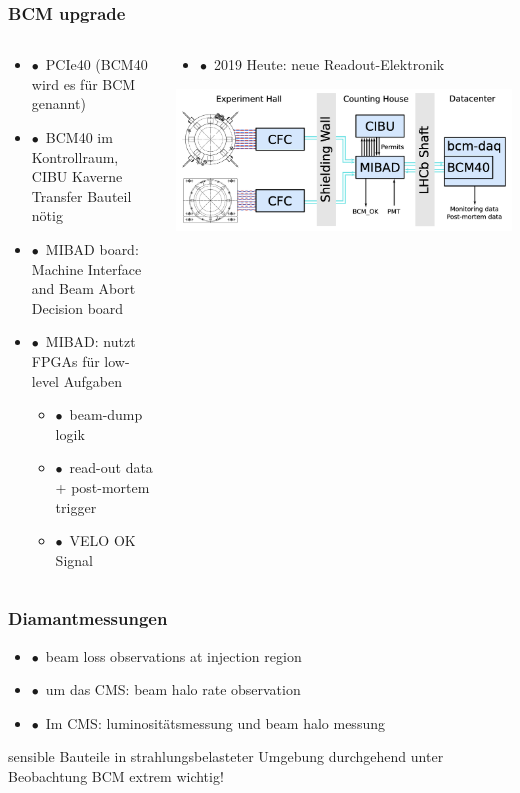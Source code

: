 \documentclass[aspectratio=1610, 12pt, xcolor=dvipsnames]{beamer}
\begin{document}
\begin{frame}\frametitle{BCM upgrade}
  \begin{columns}
    \begin{column}[c]{0.48\textwidth}
      \begin{itemize}
        \item $\bullet$\, \to PCIe40 (BCM40 wird es für BCM genannt)
        \item $\bullet$\, BCM40 im Kontrollraum, CIBU Kaverne \to Transfer Bauteil nötig
        \item $\bullet$\, \to MIBAD board: Machine Interface and Beam Abort Decision board
        \item $\bullet$\, MIBAD: nutzt FPGAs für low-level Aufgaben
        \begin{itemize}
          \item $\bullet$\, beam-dump logik
          \item $\bullet$\, read-out data + post-mortem trigger
          \item $\bullet$\, VELO OK Signal
        \end{itemize}
      \end{itemize}
    \end{column}
    \begin{column}[c]{0.48\textwidth}
      \begin{itemize}
        \item $\bullet$\, 2019 \to Heute: neue Readout-Elektronik
      \end{itemize}
      \includegraphics[width=\textwidth]{plots/data_aquisition_chain.png}
    \end{column}
  \end{columns}
\end{frame}

\begin{frame}\frametitle{Diamantmessungen}
  \begin{itemize}
    \item $\bullet$\, beam loss observations at injection region
    \item $\bullet$\, um das CMS: beam halo rate observation
    \item $\bullet$\, Im CMS: luminositätsmessung und beam halo messung
  \end{itemize}
  \to sensible Bauteile in strahlungsbelasteter Umgebung \to durchgehend unter Beobachtung
  \to BCM extrem wichtig!
\end{frame}
\end{document}
